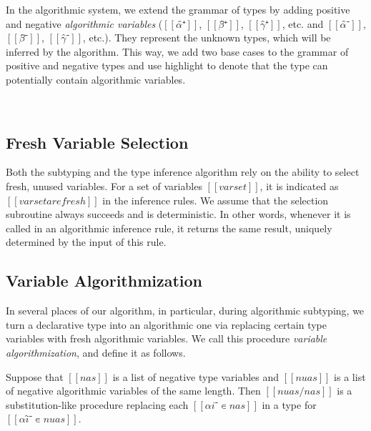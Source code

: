 \documentclass[acmsmall,natbib=false,review,anonymous]{acmart}
\begin{document}
In the algorithmic system, we extend the grammar of types
by adding positive and negative \emph{algorithmic variables}
($[[α̂⁺]]$, $[[β̂⁺]]$, $[[γ̂⁺]]$, etc. and $[[α̂⁻]]$, $[[β̂⁻]]$, $[[γ̂⁻]]$, etc.).
They represent the unknown types, which will be inferred by the algorithm.
This way, we add two base cases to the grammar of 
positive and negative types and use highlight to denote that the type
can potentially contain algorithmic variables.

\begin{definition}
  \label{def:algo-types}
  \hfill\\
  \begin{multicols}{2}
    \ottgrammartabular{
      \ottuN\ottinterrule
    }

    \ottgrammartabular{
      \ottuP\ottinterrule
    }
    \columnbreak
  \end{multicols}
\end{definition}

\subsection{Fresh Variable Selection}
\label{sec:fresh-selection}
Both the subtyping and the type inference algorithm
rely on the ability to select fresh, unused variables.
For a set of variables $[[varset]]$, it is indicated as 
$[[varset are fresh]]$ in the inference rules.
We assume that the selection subroutine always succeeds and is 
deterministic. In other words, whenever it is called in 
an algorithmic inference rule, it returns the same result, 
uniquely determined by the input of this rule.

\subsection{Variable Algorithmization}
\label{sec:variable-algorithmization}

In several places of our algorithm, in particular, during
algorithmic subtyping,
we turn a declarative type into an algorithmic one
via replacing certain type variables with fresh algorithmic variables.
We call this procedure \emph{variable algorithmization}, and define it as follows.

\begin{definition}
  Suppose that $[[nas]]$ is a list of negative type variables
  and $[[nuas]]$ is a list of negative algorithmic variables of the same length. 
  Then $[[ nuas/nas ]]$ is a substitution-like procedure replacing each $[[αi⁻ ∊ {nas}]]$
  in a type for $[[αî⁻ ∊ {nuas}]]$.
\end{definition}
\end{document}
